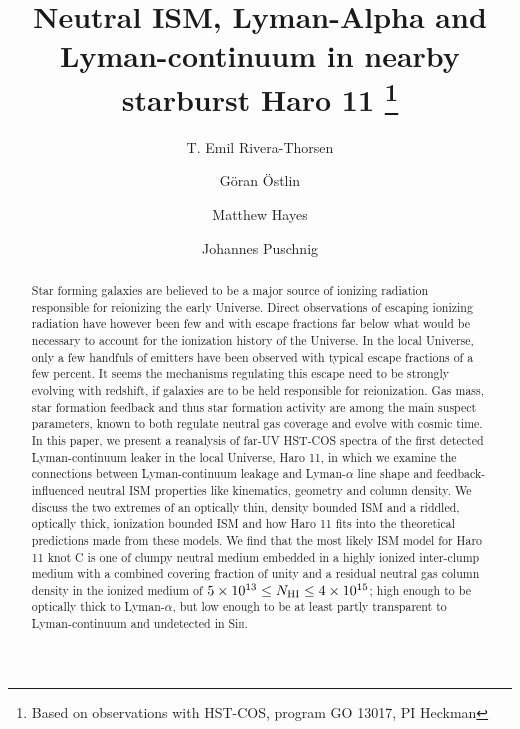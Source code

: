 \documentclass[twocolumn]{aastex61}
\begin{document}
\title{Neutral ISM, Lyman-Alpha and Lyman-continuum in nearby starburst Haro 11
		                    \footnote{Based on observations with HST-COS, program GO 13017, PI Heckman}
	            }


\author{T. Emil Rivera-Thorsen}
\author{Göran Östlin}
\author{Matthew Hayes}
\author{Johannes Puschnig}


\begin{abstract}
Star forming galaxies are believed to be a major source of ionizing
radiation responsible for reionizing the early Universe. Direct
observations of escaping ionizing radiation have however been few and
with escape fractions far below what would be necessary to account for
the ionization history of the Universe. In the local Universe, only a
few handfuls of emitters have been observed with typical escape
fractions of a few percent. It seems the mechanisms regulating this
escape need to be strongly evolving with redshift, if galaxies are to be
held responsible for reionization. Gas mass, star formation feedback and
thus star formation activity are among the main suspect parameters,
known to both regulate neutral gas coverage and evolve with cosmic time.
In this paper, we present a reanalysis of far-UV HST-COS spectra of the
first detected Lyman-continuum leaker in the local Universe, Haro 11, in
which we examine the connections between Lyman-continuum leakage and
Lyman-$\alpha$ line shape and feedback-influenced neutral ISM properties
like kinematics, geometry and column density. We discuss the two
extremes of an optically thin, density bounded ISM and a riddled,
optically thick, ionization bounded ISM and how Haro 11 fits into the
theoretical predictions made from these models. We find that the most
likely ISM model for Haro 11 knot C is one of clumpy neutral medium
embedded in a highly ionized inter-clump medium with a combined covering
fraction of unity and a residual neutral gas column density in the
ionized medium of
$5 \times 10^{13} \leq N_{\rm HI} \leq 4 \times 10^{15}$; high enough to
be optically thick to Lyman-$\alpha$, but low enough to be at least
partly transparent to Lyman-continuum and undetected in Si\textsc{ii}.
\end{abstract}
\end{document}
